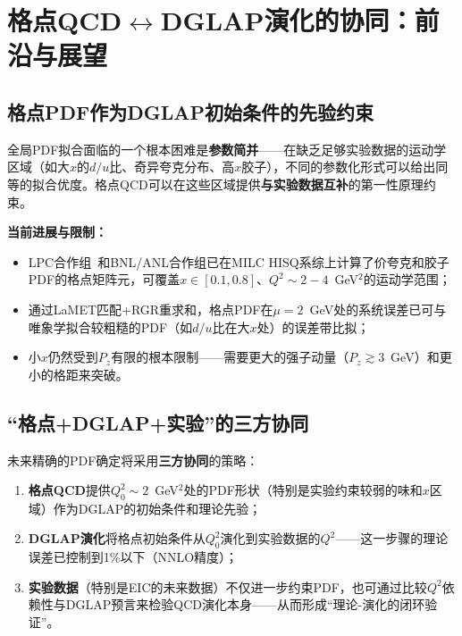\documentclass[12pt,a4paper]{ctexart}
\theoremstyle{definition}
\begin{document}
\section{格点QCD$\leftrightarrow$DGLAP演化的协同：前沿与展望}

\subsection{格点PDF作为DGLAP初始条件的先验约束}

全局PDF拟合面临的一个根本困难是\textbf{参数简并}——在缺乏足够实验数据的运动学区域（如大$x$的$d/u$比、奇异夸克分布、高$x$胶子），不同的参数化形式可以给出同等的拟合优度。格点QCD可以在这些区域提供\textbf{与实验数据互补}的第一性原理约束。

\textbf{当前进展与限制：}
\begin{itemize}
    \item LPC合作组~\cite{He2024unpolTMD}和BNL/ANL合作组已在MILC HISQ系综上计算了价夸克和胶子PDF的格点矩阵元，可覆盖$x \in [0.1, 0.8]$、$Q^2 \sim 2-4$~GeV$^2$的运动学范围；
    \item 通过LaMET匹配+RGR重求和，格点PDF在$\mu=2$~GeV处的系统误差已可与唯象学拟合较粗糙的PDF（如$d/u$比在大$x$处）的误差带比拟；
    \item 小$x$仍然受到$P_z$有限的根本限制——需要更大的强子动量（$P_z \gtrsim 3$~GeV）和更小的格距来突破。
\end{itemize}

\subsection{``格点+DGLAP+实验''的三方协同}

未来精确的PDF确定将采用\textbf{三方协同}的策略：
\begin{enumerate}[leftmargin=*]
    \item \textbf{格点QCD}提供$Q_0^2 \sim 2$~GeV$^2$处的PDF形状（特别是实验约束较弱的味和$x$区域）作为DGLAP的初始条件和理论先验；
    \item \textbf{DGLAP演化}将格点初始条件从$Q_0^2$演化到实验数据的$Q^2$——这一步骤的理论误差已控制到1\%以下（NNLO精度）；
    \item \textbf{实验数据}（特别是EIC的未来数据）不仅进一步约束PDF，也可通过比较$Q^2$依赖性与DGLAP预言来检验QCD演化本身——从而形成``理论-演化的闭环验证''。
\end{enumerate}
\end{document}
